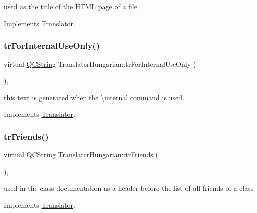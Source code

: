 used as the title of the H\+T\+ML page of a file 

Implements \mbox{\hyperlink{class_translator}{Translator}}.

\mbox{\label{class_translator_hungarian_aa0ee70d497197a9d4aacaf007f70c5c7}} 
\subsubsection{\texorpdfstring{trForInternalUseOnly()}{trForInternalUseOnly()}}
{\footnotesize\ttfamily virtual \mbox{\hyperlink{class_q_c_string}{Q\+C\+String}} Translator\+Hungarian\+::tr\+For\+Internal\+Use\+Only (\begin{DoxyParamCaption}{ }\end{DoxyParamCaption})\hspace{0.3cm}{\ttfamily [inline]}, {\ttfamily [virtual]}}

this text is generated when the \textbackslash{}internal command is used. 

Implements \mbox{\hyperlink{class_translator}{Translator}}.

\mbox{\label{class_translator_hungarian_a6d4a08b33d75ea8e927c15cf90efb7c3}} 
\subsubsection{\texorpdfstring{trFriends()}{trFriends()}}
{\footnotesize\ttfamily virtual \mbox{\hyperlink{class_q_c_string}{Q\+C\+String}} Translator\+Hungarian\+::tr\+Friends (\begin{DoxyParamCaption}{ }\end{DoxyParamCaption})\hspace{0.3cm}{\ttfamily [inline]}, {\ttfamily [virtual]}}

used in the class documentation as a header before the list of all friends of a class 

Implements \mbox{\hyperlink{class_translator}{Translator}}.

\mbox{\label{class_translator_hungarian_a22fc73d15c9cfbd8c17ed37d371e8441}} 

